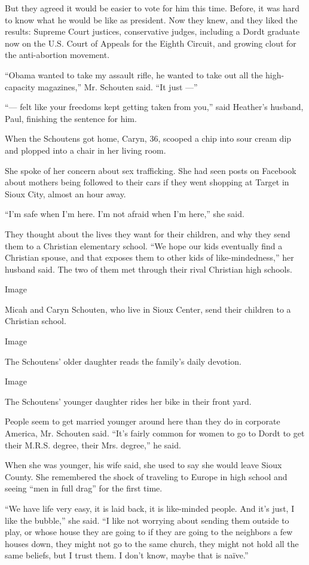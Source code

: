 But they agreed it would be easier to vote for him this time. Before, it
was hard to know what he would be like as president. Now they knew, and
they liked the results: Supreme Court justices, conservative judges,
including a Dordt graduate now on the U.S. Court of Appeals for the
Eighth Circuit, and growing clout for the anti-abortion movement.

``Obama wanted to take my assault rifle, he wanted to take out all the
high-capacity magazines,'' Mr. Schouten said. ``It just ---''

``--- felt like your freedoms kept getting taken from you,'' said
Heather's husband, Paul, finishing the sentence for him.

When the Schoutens got home, Caryn, 36, scooped a chip into sour cream
dip and plopped into a chair in her living room.

She spoke of her concern about sex trafficking. She had seen posts on
Facebook about mothers being followed to their cars if they went
shopping at Target in Sioux City, almost an hour away.

``I'm safe when I'm here. I'm not afraid when I'm here,'' she said.

They thought about the lives they want for their children, and why they
send them to a Christian elementary school. ``We hope our kids
eventually find a Christian spouse, and that exposes them to other kids
of like-mindedness,'' her husband said. The two of them met through
their rival Christian high schools.

Image

Micah and Caryn Schouten, who live in Sioux Center, send their children
to a Christian school.

Image

The Schoutens' older daughter reads the family's daily devotion.

Image

The Schoutens' younger daughter rides her bike in their front yard.

People seem to get married younger around here than they do in corporate
America, Mr. Schouten said. ``It's fairly common for women to go to
Dordt to get their M.R.S. degree, their Mrs. degree,'' he said.

When she was younger, his wife said, she used to say she would leave
Sioux County. She remembered the shock of traveling to Europe in high
school and seeing ``men in full drag'' for the first time.

``We have life very easy, it is laid back, it is like-minded people. And
it's just, I like the bubble,'' she said. ``I like not worrying about
sending them outside to play, or whose house they are going to if they
are going to the neighbors a few houses down, they might not go to the
same church, they might not hold all the same beliefs, but I trust them.
I don't know, maybe that is naïve.''

